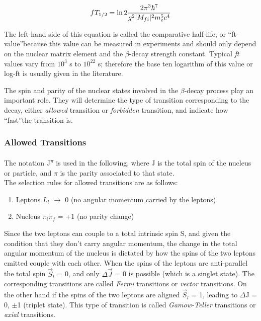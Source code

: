 \documentclass[a4paper,12pt,twoside]{report}
\begin{document}
\begin{equation}
    fT_{1/2}= \ln2\frac{2\pi^3\hbar^7}{g^2 |M_{fi}|\textsuperscript{2} m_{e}^5c^4}
\end{equation}

The left-hand side of this equation is called the comparative half-life, or \textquotedblleft ft-value\textquotedblright   because this value can be measured in experiments and should only depend on the nuclear matrix element and the $\beta$-decay strength constant. Typical \textit{ft} values vary from $10^{3}$ s to $10^{22}$ s; therefore the base ten logarithm of this value or log-ft is usually given in the literature. 

The spin and parity of the nuclear states involved in the $\beta$-decay process play an important role. They will determine the type of transition corresponding to the decay, either \textit{allowed} transition or \textit{forbidden} transition, and indicate how \textquotedblleft fast\textquotedblright the transition is.

\subsubsection{Allowed Transitions}

The notation J\textsuperscript{$\pi$} is used in the following, where J is the total spin of the nucleus or particle, and $\pi$ is the parity associated to that state.\\ The selection rules for allowed transitions are as follows:
\begin{enumerate}
    \item Leptons  $L_{l}$   $\rightarrow$ 0 (no angular momentum carried by the leptons)
\item Nucleus $\pi_{i}\pi_{f}$ = +1 (no parity change)
\end{enumerate}

Since the two leptons can couple to a total intrinsic spin S, and given the condition that they don’t carry angular momentum, the change in the total angular momentum of the nucleus is dictated by how the spins of the two leptons emitted couple with each other. When the spins of the leptons are anti-parallel the total spin $\vec{S}_{l}$ = 0, and only $\Delta\vec{J}$ = 0 is possible (which is a singlet state). The corresponding transitions are called \textit{Fermi} transitions or \textit{vector} transitions. On the other hand if the spins of the two leptons are aligned $\vec{S}_{l}$ = 1, leading to $\Delta$J = 0, $\pm$1 (triplet state). This type of transition is called \textit{Gamow-Teller} transitions or \textit{axial} transitions. 
\\
\end{document}
